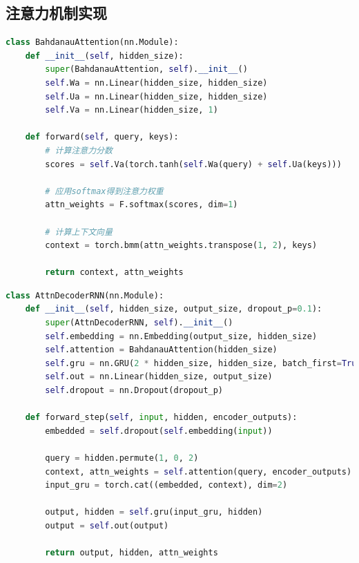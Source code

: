 \documentclass[a4paper]{article}
\begin{document}
\subsection{注意力机制实现}
\begin{lstlisting}[language=Python, caption=Bahdanau注意力机制]
class BahdanauAttention(nn.Module):
    def __init__(self, hidden_size):
        super(BahdanauAttention, self).__init__()
        self.Wa = nn.Linear(hidden_size, hidden_size)
        self.Ua = nn.Linear(hidden_size, hidden_size)
        self.Va = nn.Linear(hidden_size, 1)

    def forward(self, query, keys):
        # 计算注意力分数
        scores = self.Va(torch.tanh(self.Wa(query) + self.Ua(keys)))
        
        # 应用softmax得到注意力权重
        attn_weights = F.softmax(scores, dim=1)
        
        # 计算上下文向量
        context = torch.bmm(attn_weights.transpose(1, 2), keys)
        
        return context, attn_weights
\end{lstlisting}

\begin{lstlisting}[language=Python, caption=注意力解码器实现]
class AttnDecoderRNN(nn.Module):
    def __init__(self, hidden_size, output_size, dropout_p=0.1):
        super(AttnDecoderRNN, self).__init__()
        self.embedding = nn.Embedding(output_size, hidden_size)
        self.attention = BahdanauAttention(hidden_size)
        self.gru = nn.GRU(2 * hidden_size, hidden_size, batch_first=True)
        self.out = nn.Linear(hidden_size, output_size)
        self.dropout = nn.Dropout(dropout_p)

    def forward_step(self, input, hidden, encoder_outputs):
        embedded = self.dropout(self.embedding(input))
        
        query = hidden.permute(1, 0, 2)
        context, attn_weights = self.attention(query, encoder_outputs)
        input_gru = torch.cat((embedded, context), dim=2)
        
        output, hidden = self.gru(input_gru, hidden)
        output = self.out(output)
        
        return output, hidden, attn_weights
\end{lstlisting}
\end{document}
